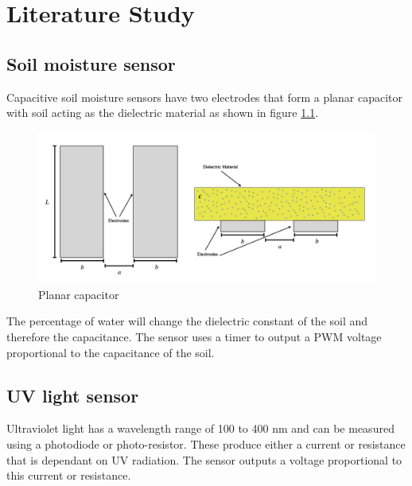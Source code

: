 \graphicspath{{literature_study/fig/}}

\chapter{Literature Study}
\label{chap:literature_study}

\section{Soil moisture sensor}
Capacitive soil moisture sensors have two electrodes that form a planar capacitor with soil acting as the dielectric material as shown in figure \ref{fig:capacitor}. 

\begin{figure}[!h]
    \centering
    \includegraphics[width= 0.9\linewidth]{coplanar_capacitor_drawing.png}
    \caption{Planar capacitor \cite{moisture_sensor_img}}
    \label{fig:capacitor}
\end{figure}

The percentage of water will change the dielectric constant of the soil and therefore the capacitance. The sensor uses a timer to output a PWM voltage proportional to the capacitance of the soil. \cite{moisture_sensor_img}

\section{UV light sensor}
Ultraviolet light has a wavelength range of 100 to 400 nm and can be measured using a photodiode or photo-resistor. These produce either a current or resistance that is dependant on UV radiation. The sensor outputs a voltage proportional to this current or resistance. \cite{UV_sensor}
